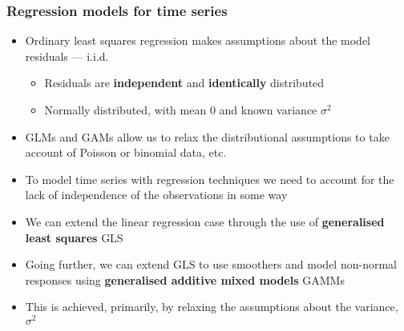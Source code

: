 \documentclass{beamer}
\begin{document}
\begin{frame}
    \frametitle{Regression models for time series}
    \begin{itemize}
        \item Ordinary least squares regression makes assumptions about the model residuals --- \alert{i.i.d.}
        \begin{itemize}
            \item Residuals are \textbf{independent} and \textbf{identically} distributed
            \item Normally distributed, with mean 0 and known variance $\sigma^2$
        \end{itemize}
        \item GLMs and GAMs allow us to relax the distributional assumptions to take account of Poisson or binomial data, etc.
        \item To model time series with regression techniques we need to account for the lack of independence of the observations in some way
        \item We can extend the linear regression case through the use of \textbf{generalised least squares} \alert{GLS}
        \item Going further, we can extend GLS to use smoothers and model non-normal responses using \textbf{generalised additive mixed models} \alert{GAMMs}
        \item This is achieved, primarily, by relaxing the assumptions about the variance, $\sigma^2$
    \end{itemize}
\end{frame}
\end{document}
